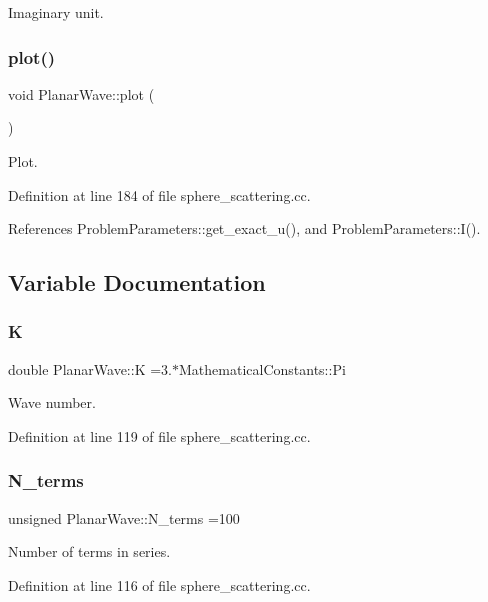 Imaginary unit. 

\mbox{\label{namespacePlanarWave_afe1e9812d1b1dc40a89f7a1f18d1165f}} 
\subsubsection{\texorpdfstring{plot()}{plot()}}
{\footnotesize\ttfamily void Planar\+Wave\+::plot (\begin{DoxyParamCaption}{ }\end{DoxyParamCaption})}



Plot. 



Definition at line 184 of file sphere\+\_\+scattering.\+cc.



References Problem\+Parameters\+::get\+\_\+exact\+\_\+u(), and Problem\+Parameters\+::\+I().



\subsection{Variable Documentation}
\mbox{\label{namespacePlanarWave_a1d51c00058fbc80aa9d255fffd92abac}} 
\subsubsection{\texorpdfstring{K}{K}}
{\footnotesize\ttfamily double Planar\+Wave\+::K =3.$\ast$Mathematical\+Constants\+::\+Pi}



Wave number. 



Definition at line 119 of file sphere\+\_\+scattering.\+cc.

\mbox{\label{namespacePlanarWave_a56abdb2474ccaffd88346ee3607d8672}} 
\subsubsection{\texorpdfstring{N\+\_\+terms}{N\_terms}}
{\footnotesize\ttfamily unsigned Planar\+Wave\+::\+N\+\_\+terms =100}



Number of terms in series. 



Definition at line 116 of file sphere\+\_\+scattering.\+cc.

